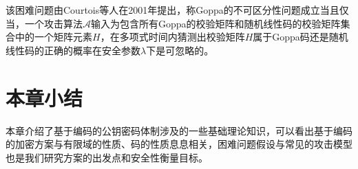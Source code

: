 \begin{define}[Goppa码的不可区分性问题]
	该困难问题由Courtois等人在2001年提出，称Goppa的不可区分性问题成立当且仅当，一个攻击算法$\mathcal{A}$输入为包含所有Goppa的校验矩阵和随机线性码的校验矩阵集合中的一个矩阵元素$H$，在多项式时间内猜测出校验矩阵$H$属于Goppa码还是随机线性码的正确的概率在安全参数$\lambda$下是可忽略的。
\end{define}
\section{本章小结}
本章介绍了基于编码的公钥密码体制涉及的一些基础理论知识，可以看出基于编码的加密方案与有限域的性质、码的性质息息相关，困难问题假设与常见的攻击模型也是我们研究方案的出发点和安全性衡量目标。